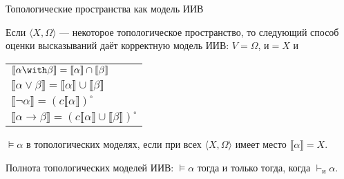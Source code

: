 \documentclass[aspectratio=169]{beamer}
\begin{document}
\begin{frame}{Топологические пространства как модель ИИВ}
\begin{thmrus}Если $\langle X, \Omega\rangle$ --- некоторое топологическое пространство, то следующий способ оценки высказываний
даёт корректную модель ИИВ: $V = \Omega$, $\text{и} = X$ и 
\begin{tabular}{l}
$\llbracket \alpha \with \beta \rrbracket = \llbracket \alpha \rrbracket \cap \llbracket \beta \rrbracket$\\
$\llbracket \alpha \vee \beta \rrbracket = \llbracket \alpha \rrbracket \cup \llbracket \beta \rrbracket$\\
$\llbracket \neg\alpha \rrbracket = (c\llbracket \alpha \rrbracket)^\circ$\\
$\llbracket \alpha \rightarrow \beta \rrbracket = (c\llbracket \alpha \rrbracket \cup \llbracket \beta \rrbracket)^\circ$
\end{tabular}
\end{thmrus}

\begin{defrus}
$\models\alpha$ в топологических моделях, если при всех $\langle X,\Omega\rangle$ имеет место $\llbracket \alpha \rrbracket = X$.
\end{defrus}

\begin{thmrus}Полнота топологических моделей ИИВ: $\models\alpha$ тогда и только тогда, когда $\vdash_\text{и}\alpha$.
\end{thmrus}

\end{frame}
\end{document}
